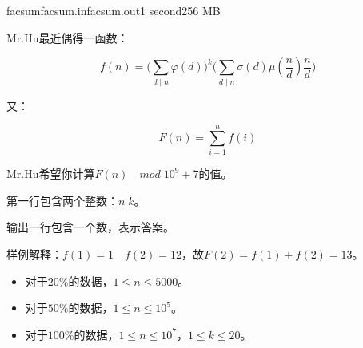\documentclass[11pt,a4paper,oneside]{article}
\begin{document}
\begin{problem}{facsum}{facsum.in}{facsum.out}{1 second}{256 MB}	
	
	Mr.Hu最近偶得一函数：
	
	$$
		f(n) = \big (\sum_{d \mid n} \varphi(d) \big )^k \big (\sum_{d \mid n} \sigma(d)\mu(\frac{n}{d})\frac{n}{d} \big)
	$$
	
	又：
	
	$$
		F(n) = \sum_{i = 1}^{n} f(i)
	$$
	
	Mr.Hu希望你计算$F(n) \quad mod \; 10^9 + 7$的值。
	
	\InputFile
	
	第一行包含两个整数：$n \; k$。
	
	\OutputFile
	
	输出一行包含一个数，表示答案。

	\Example
	
	\begin{example}
	\end{example}
	
	样例解释：$f(1) = 1 \quad f(2) = 12$，故$F(2) = f(1) + f(2) = 13$。
	
	\Note
	
	\begin{itemize}
		\item 对于$20\%$的数据，$1 \leq n \leq 5000$。
		\item 对于$50\%$的数据，$1 \leq n \leq 10^5$。
		\item 对于$100\%$的数据，$1 \leq n \leq 10^7$，$1 \leq k \leq 20$。
	\end{itemize}

\end{problem}
\end{document}
